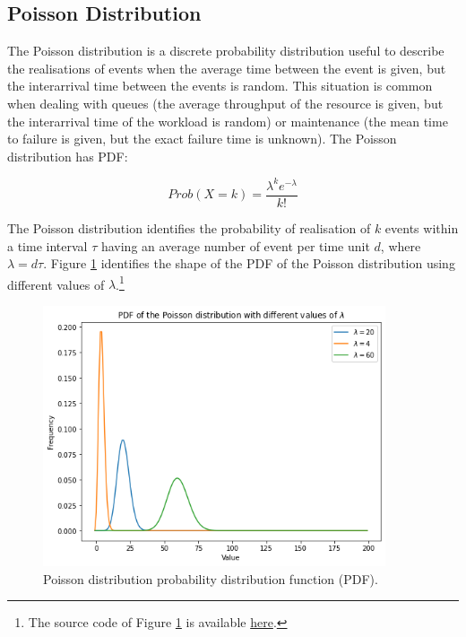 \subsection{Poisson Distribution} \label{secPoisson}
The Poisson distribution is a discrete probability distribution useful to describe the realisations of events when the average time between the event is given, but the interarrival time between the events is random. This situation is common when dealing with queues (the average throughput of the resource is given, but the interarrival time of the workload is random) or maintenance (the mean time to failure is given, but the exact failure time is unknown). The Poisson distribution has PDF:

\begin{equation}
Prob\left(X=k\right)=\frac{\lambda^ke^{-\lambda}}{k!}
\label{eq_poissonPDF}
\end{equation}

The Poisson distribution identifies the probability of realisation of $k$ events within a time interval $\tau$ having an average number of event per time unit $d$, where $\lambda=d\tau$. Figure \ref{fig_poisson} identifies the shape of the PDF of the Poisson distribution using different values of $\lambda$.\footnote{The source code of Figure \ref{fig_poisson} is available \href{https://github.com/aletuf93/logproj/blob/master/examples/03.\%20Statistics.ipynb}{here}.
}


\begin{figure}[hbt!]
\centering
\includegraphics[width=0.9\textwidth]{SectionLetsMath/elemStat_figures/fig_poisson.png}
\captionsetup{type=figure}
\caption{Poisson distribution probability distribution function (PDF).}
\label{fig_poisson}
\end{figure}

